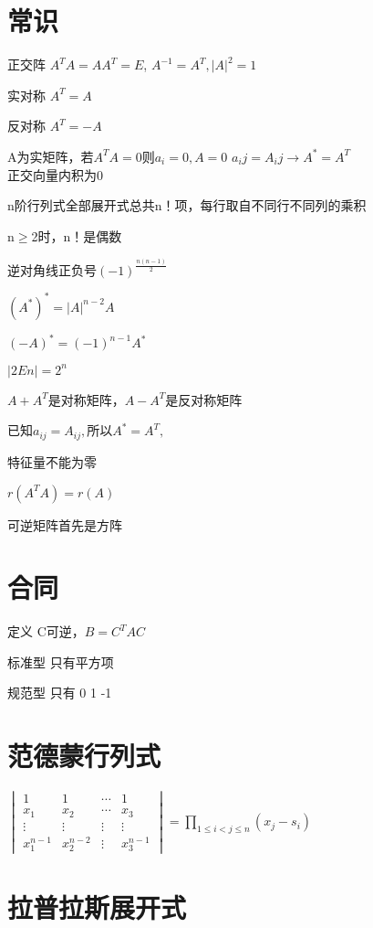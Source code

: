 \documentclass[UTF8]{ctexart}
\begin{document}
\section{常识}

正交阵 $A^{T}A=AA^{T}=E$, $A^{-1}=A^{T} , |A|^2 =1$


实对称 $A^{T}=A$

反对称 $A^{T}=-A$

A为实矩阵，若$A^{T}A=0\text{则}$$a_{i}=0,A=0$
$a_ij=A_ij \rightarrow A^*=A^T$ \\

正交向量内积为0

n阶行列式全部展开式总共n！项，每行取自不同行不同列的乘积

n$\geq$2时，n！是偶数

逆对角线正负号$(-1)^{\frac{n(n-1)}{2}}$

$(A^{*})^{*}=|A|^{n-2}A$

$(-A)^*=(-1)^{n-1} A^*$

$|2En|=2^n$


$A+A^{T}$是对称矩阵，$A-A^{T}$是反对称矩阵

已知$a_{ij}=A_{ij} , \mbox{所以} A^* =A^T ,$

特征量不能为零

$r(A^TA)=r(A)$

可逆矩阵首先是方阵


\section{合同}

定义 C可逆，$B=C^{T}AC$

标准型 只有平方项

规范型 只有 0 1 -1

\section{范德蒙行列式}

$\begin{vmatrix}1 & 1 & \cdots & 1\\
x_{1} & x_{2} & \cdots & x_{3}\\
\vdots & \vdots & \vdots & \vdots\\
x_{1}^{n-1} & x_{2}^{n-2} & \vdots & x_{3}^{n-1}
\end{vmatrix}=\prod_{1\leq i<j\leq n}(x_{j}-s_{i})$

\section{拉普拉斯展开式}
\end{document}
